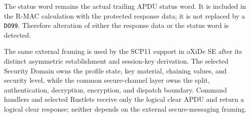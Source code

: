 The status word remains the actual trailing APDU status word.  It is included
in the R-MAC calculation with the protected response data; it is not replaced
by a \texttt{DO99}.  Therefore alteration of either the response data or the
status word is detected.

The same external framing is used by the SCP11 support in oXiDe SE after its
distinct asymmetric establishment and session-key derivation.  The selected
Security Domain owns the profile state, key material, chaining values, and
security level, while the common secure-channel layer owns the split,
authentication, decryption, encryption, and dispatch boundary.  Command
handlers and selected Rustlets receive only the logical clear APDU and return a
logical clear response; neither depends on the external secure-messaging
framing.

